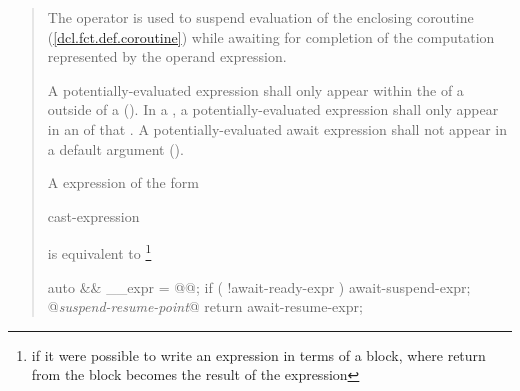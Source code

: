 \begin{quote}
\pnum
The  operator is used to suspend evaluation of the enclosing coroutine (\ref{dcl.fct.def.coroutine}) while awaiting
for completion of the computation represented by the operand expression.



\pnum
A potentially-evaluated 
 expression shall only appear within the  of a  outside of a  ().
In a , a potentially-evaluated  expression shall only appear in an  of that .
A potentially-evaluated await expression shall not appear in a default argument ().




\pnum
A  expression of the form

\begin{ncbnf}
	 cast-expression
\end{ncbnf}
is equivalent to \footnote{if it were possible to write
an expression in terms of a block, where return from the 
block becomes the result of the expression}

\begin{codeblock}
{
  auto && __expr = @@;
  if ( !await-ready-expr ) {
    await-suspend-expr;
    @\textit{suspend-resume-point}@
  }
  return await-resume-expr;
}
\end{codeblock}



\end{quote}
